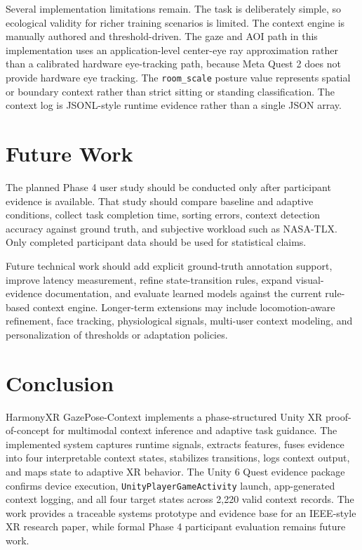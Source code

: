 \documentclass[conference]{IEEEtran}
\begin{document}
Several implementation limitations remain. The task is deliberately simple, so ecological validity for richer training scenarios is limited. The context engine is manually authored and threshold-driven. The gaze and AOI path in this implementation uses an application-level center-eye ray approximation rather than a calibrated hardware eye-tracking path, because Meta Quest 2 does not provide hardware eye tracking. The \texttt{room\_scale} posture value represents spatial or boundary context rather than strict sitting or standing classification. The context log is JSONL-style runtime evidence rather than a single JSON array.

\section{Future Work}
The planned Phase 4 user study should be conducted only after participant evidence is available. That study should compare baseline and adaptive conditions, collect task completion time, sorting errors, context detection accuracy against ground truth, and subjective workload such as NASA-TLX. Only completed participant data should be used for statistical claims.

Future technical work should add explicit ground-truth annotation support, improve latency measurement, refine state-transition rules, expand visual-evidence documentation, and evaluate learned models against the current rule-based context engine. Longer-term extensions may include locomotion-aware refinement, face tracking, physiological signals, multi-user context modeling, and personalization of thresholds or adaptation policies.

\section{Conclusion}
HarmonyXR GazePose-Context implements a phase-structured Unity XR proof-of-concept for multimodal context inference and adaptive task guidance. The implemented system captures runtime signals, extracts features, fuses evidence into four interpretable context states, stabilizes transitions, logs context output, and maps state to adaptive XR behavior. The Unity 6 Quest evidence package confirms device execution, \texttt{UnityPlayerGameActivity} launch, app-generated context logging, and all four target states across 2,220 valid context records. The work provides a traceable systems prototype and evidence base for an IEEE-style XR research paper, while formal Phase 4 participant evaluation remains future work.
\end{document}
